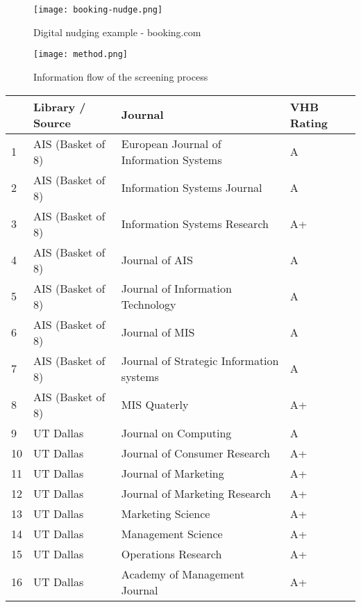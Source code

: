 
\begin{figure}[h]
    \centering
    \texttt{[image: booking-nudge.png]}
    \caption{Digital nudging example - booking.com}
    \label{fig:booking}
\end{figure}

\newpage

\begin{figure}[h]
    \centering
    \texttt{[image: method.png]}
    \caption{Information flow of the screening process}
    \label{fig:method}
\end{figure}

\newpage

\begin{table}[h!]
\small
\centering
\begin{tabular}{l|l|p{9cm}|l}
 & \textbf{Library / Source} & \textbf{Journal} & \textbf{VHB Rating} \\ \hline
1 & AIS (Basket of 8) & European Journal of Information Systems & A \\ \hline
2 & AIS (Basket of 8) & Information Systems Journal & A \\ \hline
3 & AIS (Basket of 8) & Information Systems Research & A+ \\ \hline
4 & AIS (Basket of 8) & Journal of AIS & A \\ \hline
5 & AIS (Basket of 8) & Journal of Information Technology & A \\ \hline
6 & AIS (Basket of 8) & Journal of MIS & A \\ \hline
7 & AIS (Basket of 8) & Journal of Strategic Information systems & A \\ \hline
8 & AIS (Basket of 8) & MIS Quaterly & A+ \\ \hline
9 & UT Dallas & Journal on Computing & A \\ \hline
10 & UT Dallas & Journal of Consumer Research & A+ \\ \hline
11 & UT Dallas & Journal of Marketing & A+ \\ \hline
12 & UT Dallas & Journal of Marketing Research & A+ \\ \hline
13 & UT Dallas & Marketing Science & A+ \\ \hline
14 & UT Dallas & Management Science & A+ \\ \hline
15 & UT Dallas & Operations Research & A+ \\ \hline
16 & UT Dallas & Academy of Management Journal & A+ \\ \hline

\end{tabular}
\end{table}
